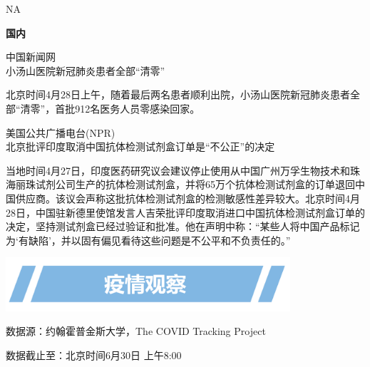 \documentclass[
]{article}
\begin{document}
NA

\vspace{5mm}

\begin{huge}{\textcolor{glaucous}{\textbf {国内}}}\end{huge}

\vspace{-3mm}

\begin{center}
\textcolor{glaucous}{中国新闻网}\\小汤山医院新冠肺炎患者全部“清零”

\end{center}

北京时间4月28日上午，随着最后两名患者顺利出院，小汤山医院新冠肺炎患者全部``清零''，首批912名医务人员零感染回家。

\begin{center}
\textcolor{glaucous}{美国公共广播电台(NPR)}\\北京批评印度取消中国抗体检测试剂盒订单是“不公正”的决定
\end{center}

当地时间4月27日，印度医药研究议会建议停止使用从中国广州万孚生物技术和珠海丽珠试剂公司生产的抗体检测试剂盒，并将65万个抗体检测试剂盒的订单退回中国供应商。该议会声称这批抗体检测试剂盒的检测敏感性差异较大。北京时间4月28日，中国驻新德里使馆发言人吉荣批评印度取消进口中国抗体检测试剂盒订单的决定，坚持测试剂盒已经过验证和批准。他在声明中称：``某些人将中国产品标记为`有缺陷'，并以固有偏见看待这些问题是不公平和不负责任的。''

\vspace{10mm}

\begin{center}
\includegraphics[height=2cm]{./input/title2.png} 
\end{center}

\begin{Large}
\vspace{-7mm}
{数据源：约翰霍普金斯大学，The COVID Tracking  Project}
\end{Large}

\vspace{-7mm}

\begin{Large}
{数据截止至：北京时间6月30日 上午8:00}
\end{Large}
\end{document}
